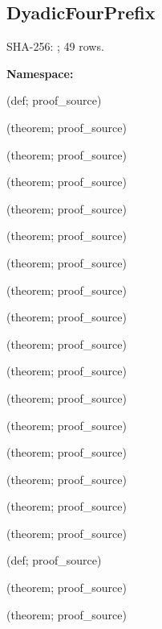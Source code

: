 \subsection*{DyadicFourPrefix}
{\footnotesize SHA-256: ; 49 rows.}\par
\begingroup\small
\textbf{Namespace:} \par
\noindent{} {\scriptsize (def; proof\_source)}\par
\noindent{} {\scriptsize (theorem; proof\_source)}\par
\noindent{} {\scriptsize (theorem; proof\_source)}\par
\noindent{} {\scriptsize (theorem; proof\_source)}\par
\noindent{} {\scriptsize (theorem; proof\_source)}\par
\noindent{} {\scriptsize (theorem; proof\_source)}\par
\noindent{} {\scriptsize (theorem; proof\_source)}\par
\noindent{} {\scriptsize (theorem; proof\_source)}\par
\noindent{} {\scriptsize (theorem; proof\_source)}\par
\noindent{} {\scriptsize (theorem; proof\_source)}\par
\noindent{} {\scriptsize (theorem; proof\_source)}\par
\noindent{} {\scriptsize (theorem; proof\_source)}\par
\noindent{} {\scriptsize (theorem; proof\_source)}\par
\noindent{} {\scriptsize (theorem; proof\_source)}\par
\noindent{} {\scriptsize (theorem; proof\_source)}\par
\noindent{} {\scriptsize (theorem; proof\_source)}\par
\noindent{} {\scriptsize (theorem; proof\_source)}\par
\noindent{} {\scriptsize (def; proof\_source)}\par
\noindent{} {\scriptsize (theorem; proof\_source)}\par
\noindent{} {\scriptsize (theorem; proof\_source)}\par
